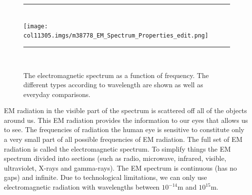 	\begin{figure}[H] %
    \begin{center}
    \rule[.1in]{\figurerulewidth}{.005in} \\
        \label{m38778*uid3!!!underscore!!!media}\label{m38778*uid3!!!underscore!!!printimage}\texttt{[image: col11305.imgs/m38778\_EM\_Spectrum\_Properties\_edit.png]} %
      \label{fig:emspectrum}
      \caption{The electromagnetic spectrum as a function of frequency. The different types according to wavelength are shown as well as everyday comparisons.
	}
    \rule[.1in]{\figurerulewidth}{.005in} \\
    \end{center}
 \end{figure}       
      \label{m38778*id187230}EM radiation in the visible part of the spectrum is scattered off all of the objects around us. This EM radiation provides the information to our eyes that allows us to see. The frequencies of radiation the human eye is sensitive to constitute only a very small part of all possible frequencies of EM radiation. The full set of EM radiation is called the electromagnetic spectrum. To simplify things the EM spectrum divided into sections (such as radio, microwave, infrared, visible, ultraviolet, X-rays and gamma-rays).
      \label{m38778*eip-855}The EM spectrum is continuous (has no gaps) and infinite. Due to technological limitations, we can only use electromagnetic radiation with wavelengths between ${10}^{-14}\text{m}$ and ${10}^{15}\text{m}$.
\label{m38778*secfhsst!!!underscore!!!id117}
